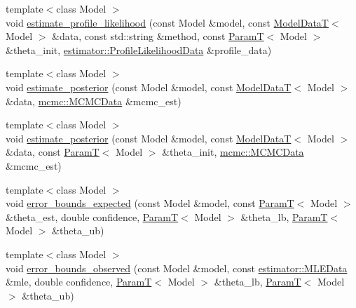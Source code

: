 \begin{DoxyCompactItemize}
\item 
{\footnotesize template$<$class Model $>$ }\\void \hyperlink{namespacemappel_1_1methods_a94ce641513cf1a50df092bbb0700153d}{estimate\+\_\+profile\+\_\+likelihood} (const Model \&model, const \hyperlink{namespacemappel_a97f050df953605381ae9c901c3b125f1}{Model\+DataT}$<$ Model $>$ \&data, const std\+::string \&method, const \hyperlink{namespacemappel_a667925cb0d6c0e49f2f035cc5a9a6857}{ParamT}$<$ Model $>$ \&theta\+\_\+init, \hyperlink{namespacemappel_1_1estimator_structmappel_1_1estimator_1_1ProfileLikelihoodData}{estimator\+::\+Profile\+Likelihood\+Data} \&profile\+\_\+data)
\item 
{\footnotesize template$<$class Model $>$ }\\void \hyperlink{namespacemappel_1_1methods_a3c6cefc22933b3d0934f08058dd1e212}{estimate\+\_\+posterior} (const Model \&model, const \hyperlink{namespacemappel_a97f050df953605381ae9c901c3b125f1}{Model\+DataT}$<$ Model $>$ \&data, \hyperlink{structmappel_1_1mcmc_1_1MCMCData}{mcmc\+::\+M\+C\+M\+C\+Data} \&mcmc\+\_\+est)
\item 
{\footnotesize template$<$class Model $>$ }\\void \hyperlink{namespacemappel_1_1methods_ab4fefd3c7542650142b71eb694bc04ff}{estimate\+\_\+posterior} (const Model \&model, const \hyperlink{namespacemappel_a97f050df953605381ae9c901c3b125f1}{Model\+DataT}$<$ Model $>$ \&data, const \hyperlink{namespacemappel_a667925cb0d6c0e49f2f035cc5a9a6857}{ParamT}$<$ Model $>$ \&theta\+\_\+init, \hyperlink{structmappel_1_1mcmc_1_1MCMCData}{mcmc\+::\+M\+C\+M\+C\+Data} \&mcmc\+\_\+est)
\item 
{\footnotesize template$<$class Model $>$ }\\void \hyperlink{namespacemappel_1_1methods_a40f38c9be75ed5bbcc4066a289894ea1}{error\+\_\+bounds\+\_\+expected} (const Model \&model, const \hyperlink{namespacemappel_a667925cb0d6c0e49f2f035cc5a9a6857}{ParamT}$<$ Model $>$ \&theta\+\_\+est, double confidence, \hyperlink{namespacemappel_a667925cb0d6c0e49f2f035cc5a9a6857}{ParamT}$<$ Model $>$ \&theta\+\_\+lb, \hyperlink{namespacemappel_a667925cb0d6c0e49f2f035cc5a9a6857}{ParamT}$<$ Model $>$ \&theta\+\_\+ub)
\item 
{\footnotesize template$<$class Model $>$ }\\void \hyperlink{namespacemappel_1_1methods_a85b01ee85a9b891e4143ad36e98a22de}{error\+\_\+bounds\+\_\+observed} (const Model \&model, const \hyperlink{namespacemappel_1_1estimator_structmappel_1_1estimator_1_1MLEData}{estimator\+::\+M\+L\+E\+Data} \&mle, double confidence, \hyperlink{namespacemappel_a667925cb0d6c0e49f2f035cc5a9a6857}{ParamT}$<$ Model $>$ \&theta\+\_\+lb, \hyperlink{namespacemappel_a667925cb0d6c0e49f2f035cc5a9a6857}{ParamT}$<$ Model $>$ \&theta\+\_\+ub)

\end{DoxyCompactItemize}
